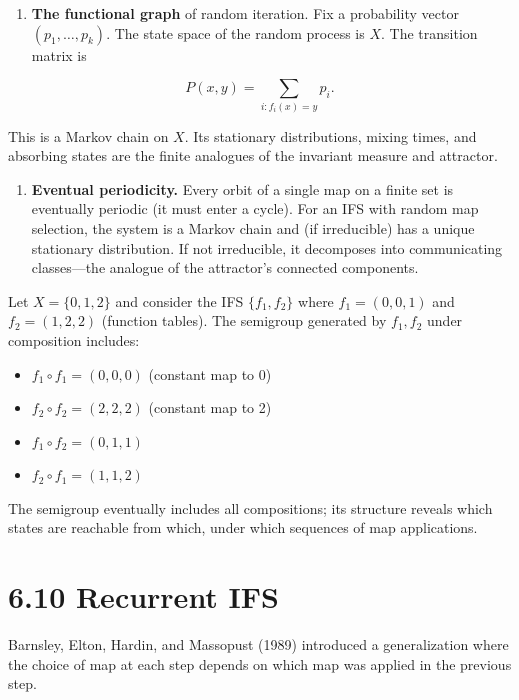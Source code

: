 \begin{enumerate}
  \item \textbf{The functional graph} of random iteration. Fix a probability vector $(p_1, \ldots, p_k)$. The state space of the random process is $X$. The transition matrix is
\end{enumerate}

\[
P(x, y) = \sum_{i : f_i(x) = y} p_i.
\]

This is a Markov chain on $X$. Its stationary distributions, mixing times, and absorbing states are the finite analogues of the invariant measure and attractor.

\begin{enumerate}
  \item \textbf{Eventual periodicity.} Every orbit of a single map on a finite set is eventually periodic (it must enter a cycle). For an IFS with random map selection, the system is a Markov chain and (if irreducible) has a unique stationary distribution. If not irreducible, it decomposes into communicating classes—the analogue of the attractor's connected components.
\end{enumerate}

\begin{example}
Let $X = \{ 0, 1, 2\} $ and consider the IFS $\{ f_1, f_2\} $ where $f_1 = (0, 0, 1)$ and $f_2 = (1, 2, 2)$ (function tables). The semigroup generated by $f_1, f_2$ under composition includes:
\end{example}

\begin{itemize}
  \item $f_1 \circ f_1 = (0, 0, 0)$ (constant map to 0)
  \item $f_2 \circ f_2 = (2, 2, 2)$ (constant map to 2)
  \item $f_1 \circ f_2 = (0, 1, 1)$
  \item $f_2 \circ f_1 = (1, 1, 2)$
\end{itemize}

The semigroup eventually includes all compositions; its structure reveals which states are reachable from which, under which sequences of map applications.

\section{6.10 Recurrent IFS}

Barnsley, Elton, Hardin, and Massopust (1989) introduced a generalization where the choice of map at each step depends on which map was applied in the previous step.


